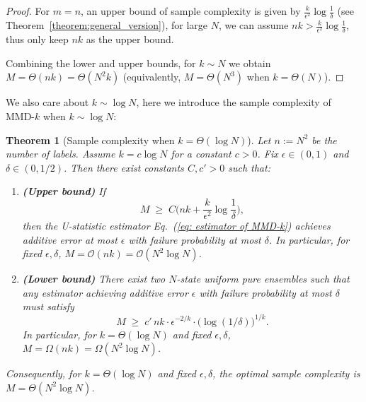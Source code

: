 \documentclass[aps,prx,reprint,superscriptaddress,amsmath,amssymb,longbibliography,floatfix]{revtex4-2}
\newcommand{\scO}{\mathcal{O}}
\theoremstyle{plain}
\newtheorem{theorem}{Theorem}[section]
\theoremstyle{definition}
\theoremstyle{remark}
\begin{document}
\begin{proof}
For $m=n$, an upper bound of sample complexity is given by $\frac{k}{\epsilon^2}\log \frac{1}{\delta}$ (see Theorem~\ref{theorem:general_version}), for large $N$, we can assume $nk> \frac{k}{\epsilon^2}\log \frac{1}{\delta} $, thus only keep $n k$ as the upper bound.

Combining the lower and upper bounds, for $k\sim N$ we obtain
$M=\Theta(nk)=\Theta(N^2k)$ (equivalently, $M=\Theta(N^3)$ when $k=\Theta(N)$).
\end{proof}

We also care about $k\sim\log N$, here we introduce the sample complexity of MMD-$k$ when $k\sim\log N$:
\begin{theorem}[Sample complexity when $k=\Theta(\log N)$]
Let $n:=N^2$ be the number of labels. Assume $k=c\log N$ for a constant $c>0$.
Fix $\epsilon\in(0,1)$ and $\delta\in(0,1/2)$. Then there exist constants $C,c'>0$
such that:
\begin{enumerate}
\item \textbf{(Upper bound)} If
\begin{equation}
M \;\ge\; C\Big(nk+\frac{k}{\epsilon^2}\log\frac{1}{\delta}\Big),
\label{eq:app-local-log-k-upper}
\end{equation}
then the U-statistic estimator Eq.~(\ref{eq: estimator of MMD-k}) achieves additive error at most $\epsilon$ with
failure probability at most $\delta$. In particular, for fixed $\epsilon,\delta$,
$M=\scO(nk)=\scO(N^2\log N)$.
\item \textbf{(Lower bound)} There exist two $N$-state uniform pure ensembles such that
any estimator achieving additive error $\epsilon$ with failure probability at most $\delta$
must satisfy
\begin{equation}
M\;\ge\; c'\, nk\cdot \epsilon^{-2/k}\cdot \big(\log(1/\delta)\big)^{1/k}.
\label{eq:app-local-log-k-lower}
\end{equation}
In particular, for $k=\Theta(\log N)$ and fixed $\epsilon,\delta$,
$M=\Omega(nk)=\Omega(N^2\log N)$.
\end{enumerate}
Consequently, for $k=\Theta(\log N)$ and fixed $\epsilon,\delta$, the optimal
sample complexity is $M=\Theta(N^2\log N)$.
\end{theorem}
\end{document}
